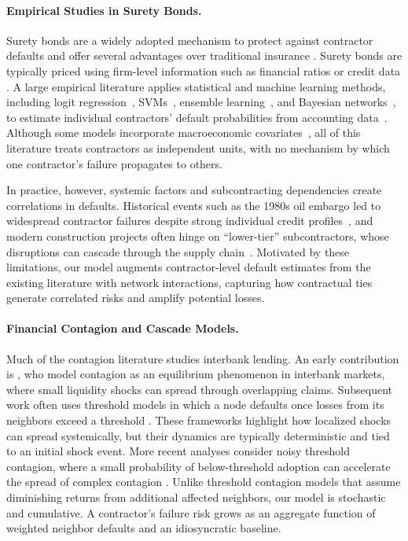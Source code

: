 \documentclass[mnsc,nonblindrev]{informs3}
\begin{document}
\paragraph{Empirical Studies in Surety Bonds.}
Surety bonds are a widely adopted mechanism to protect against contractor defaults and offer several advantages over traditional insurance \citep{schubert2002point}.  Surety bonds are typically priced using firm-level information such as financial ratios or credit data \citep{schubert2002point, kim2019default}. A large empirical literature applies statistical and machine learning methods, including logit regression~\citep{tserng2014prediction}, SVMs~\citep{tserng2011svm,horta2013company}, ensemble learning~\citep{choi2018predicting}, and Bayesian networks~\citep{cao_2022}, to estimate individual contractors’ default probabilities from accounting data~\citep{barboza2017machine,nguyen2025bankruptcy,shumway2001forecasting,vassalou2004default}. Although some models incorporate macroeconomic covariates~\citep{shumway2001forecasting,vassalou2004default}, all of this literature treats contractors as independent units, with no mechanism by which one contractor’s failure propagates to others.

In practice, however, systemic factors and subcontracting dependencies create correlations in defaults. Historical events such as the 1980s oil embargo led to widespread contractor failures despite strong individual credit profiles~\citep{russell1990surety}, and modern construction projects often hinge on ``lower-tier'' subcontractors, whose disruptions can cascade through the supply chain~\citep{dietz2018mitigating,bci2021supplychain}. Motivated by these limitations, our model augments contractor-level default estimates from the existing literature with network interactions, capturing how contractual ties generate correlated risks and amplify potential losses.



\paragraph{Financial Contagion and Cascade Models.}
Much of the contagion literature studies interbank lending. An early contribution is \citet{allenFinancialContagion2000}, who model contagion as an equilibrium phenomenon in interbank markets, where small liquidity shocks can spread through overlapping claims. Subsequent work often uses threshold models in which a node defaults once losses from its neighbors exceed a threshold \citep{watts2002simple,gai2010contagion,elliott2014financial,acemoglu2015systemic}. These frameworks highlight how localized shocks can spread systemically, but their dynamics are typically deterministic and tied to an initial shock event. More recent analyses consider noisy threshold contagion, where a small probability of below-threshold adoption can accelerate the spread of complex contagion \citep{ecklesLongTiesAccelerate2024}. Unlike threshold contagion models that assume diminishing returns from additional affected neighbors, our model is stochastic and cumulative.  A contractor’s failure risk grows as an aggregate function of weighted neighbor defaults and an idiosyncratic baseline.
\end{document}
